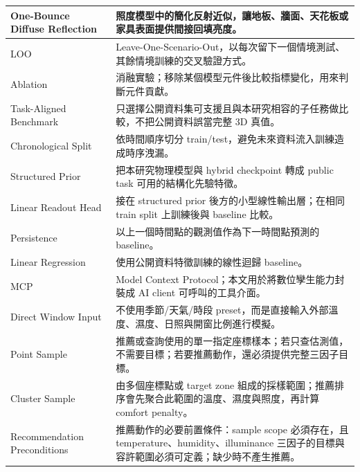 \documentclass[12pt,a4paper]{article}
\begin{document}
\begin{table}[htbp]
\begin{tabular}{|>{\raggedright\arraybackslash}p{}|>{\raggedright\arraybackslash}p{}|}
\hline
One-Bounce Diffuse Reflection & 照度模型中的簡化反射近似，讓地板、牆面、天花板或家具表面提供間接回填亮度。 \\
\hline
LOO & Leave-One-Scenario-Out，以每次留下一個情境測試、其餘情境訓練的交叉驗證方式。 \\
\hline
Ablation & 消融實驗；移除某個模型元件後比較指標變化，用來判斷元件貢獻。 \\
\hline
Task-Aligned Benchmark & 只選擇公開資料集可支援且與本研究相容的子任務做比較，不把公開資料誤當完整 3D 真值。 \\
\hline
Chronological Split & 依時間順序切分 train/test，避免未來資料流入訓練造成時序洩漏。 \\
\hline
Structured Prior & 把本研究物理模型與 hybrid checkpoint 轉成 public task 可用的結構化先驗特徵。 \\
\hline
Linear Readout Head & 接在 structured prior 後方的小型線性輸出層；在相同 train split 上訓練後與 baseline 比較。 \\
\hline
Persistence & 以上一個時間點的觀測值作為下一時間點預測的 baseline。 \\
\hline
Linear Regression & 使用公開資料特徵訓練的線性迴歸 baseline。 \\
\hline
MCP & Model Context Protocol；本文用於將數位孿生能力封裝成 AI client 可呼叫的工具介面。 \\
\hline
Direct Window Input & 不使用季節/天氣/時段 preset，而是直接輸入外部溫度、濕度、日照與開窗比例進行模擬。 \\
\hline
Point Sample & 推薦或查詢使用的單一指定座標樣本；若只查估測值，不需要目標；若要推薦動作，還必須提供完整三因子目標。 \\
\hline
Cluster Sample & 由多個座標點或 target zone 組成的採樣範圍；推薦排序會先聚合此範圍的溫度、濕度與照度，再計算 comfort penalty。 \\
\hline
Recommendation Preconditions & 推薦動作的必要前置條件：sample scope 必須存在，且 temperature、humidity、illuminance 三因子的目標與容許範圍必須可定義；缺少時不產生推薦。 \\
\hline
\end{tabular}
\end{table}
\end{document}
